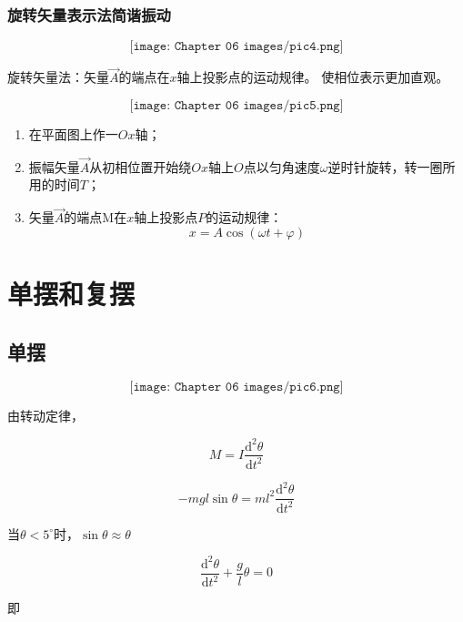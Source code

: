 \documentclass[
	12pt, %
	a4paper, %
]{myLegrandOrangeBook}
\newcommand{\degree}{^{\circ}}
\newcommand{\rmd}{\mathrm{d}}
\begin{document}
    \subsubsection{旋转矢量表示法简谐振动}

    \[
        \texttt{[image: Chapter 06 images/pic4.png]}
    \]

    旋转矢量法：矢量\(\overrightarrow{A}\)的端点在\(x\)轴上投影点的运动规律。
    使相位表示更加直观。

    \[
        \texttt{[image: Chapter 06 images/pic5.png]}
    \]

    \begin{enumerate}
        \item 在平面图上作一\(Ox\)轴；
        \item 振幅矢量\(\overrightarrow{A}\)从初相位置开始绕\(Ox\)轴上\(O\)点以匀角速度\(\omega\)逆时针旋转，转一圈所用的时间\(T\)；
        \item 矢量\(\overrightarrow{A}\)的端点M在\(x\)轴上投影点\(P\)的运动规律：
            \[
                x = A \cos \left(\omega t + \varphi\right)
            \]
    \end{enumerate}

\section{单摆和复摆}

\subsection{单摆}

    \[
        \texttt{[image: Chapter 06 images/pic6.png]}
    \]

    由转动定律，

    \begin{equation}
        M = I \frac{\rmd^2 \theta}{\rmd t^2}
    \end{equation}

    \begin{equation}
        -mg l \sin \theta = m l^2 \frac{\rmd^2 \theta}{\rmd t^2}
    \end{equation}

    当\(\theta < 5\degree\)时，\(\sin \theta \approx \theta\)

    \begin{equation}
        \frac{\rmd^2 \theta}{\rmd t^2} + \frac{g}{l}\theta = 0
    \end{equation}

    即
\end{document}
